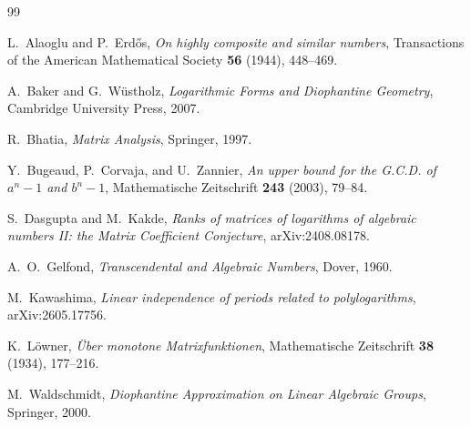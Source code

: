 \documentclass[11pt]{article}
\theoremstyle{definition}
\theoremstyle{remark}
\begin{document}
\begin{thebibliography}{99}

L.~Alaoglu and P.~Erd\H{o}s,
\emph{On highly composite and similar numbers},
Transactions of the American Mathematical Society \textbf{56} (1944), 448--469.

A.~Baker and G.~W\"ustholz,
\emph{Logarithmic Forms and Diophantine Geometry},
Cambridge University Press, 2007.

R.~Bhatia,
\emph{Matrix Analysis},
Springer, 1997.

Y.~Bugeaud, P.~Corvaja, and U.~Zannier,
\emph{An upper bound for the G.C.D. of $a^n-1$ and $b^n-1$},
Mathematische Zeitschrift \textbf{243} (2003), 79--84.

S.~Dasgupta and M.~Kakde,
\emph{Ranks of matrices of logarithms of algebraic numbers II: the Matrix Coefficient Conjecture},
arXiv:2408.08178.

A.~O.~Gelfond,
\emph{Transcendental and Algebraic Numbers},
Dover, 1960.

M.~Kawashima,
\emph{Linear independence of periods related to polylogarithms},
arXiv:2605.17756.

K.~L\"owner,
\emph{\"Uber monotone Matrixfunktionen},
Mathematische Zeitschrift \textbf{38} (1934), 177--216.

M.~Waldschmidt,
\emph{Diophantine Approximation on Linear Algebraic Groups},
Springer, 2000.

\end{thebibliography}
\end{document}
